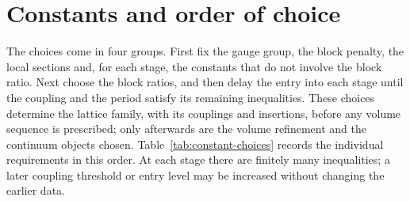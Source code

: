 
\section{Constants and order of choice}\label{sec:constants}

The choices come in four groups. First fix the gauge group, the block penalty, the local sections and, for each stage, the constants that do not involve the block ratio. Next choose the block ratios, and then delay the entry into each stage until the coupling and the period satisfy its remaining inequalities. These choices determine the lattice family, with its couplings and insertions, before any volume sequence is prescribed; only afterwards are the volume refinement and the continuum objects chosen. Table~\ref{tab:constant-choices} records the individual requirements in this order. At each stage there are finitely many inequalities; a later coupling threshold or entry level may be increased without changing the earlier data.

